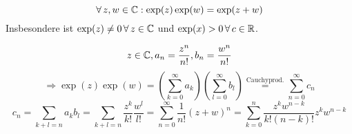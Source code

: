 \documentclass[../ana1.tex]{subfiles}
\begin{document}
\begin{satz}[Additionstherem]
    \[ \forall \, z,w\in\mathbb{C} : \exp(z) \exp(w) = \exp(z+w) \]
    Insbesondere ist \( \exp(z) \neq 0 \,\forall \, z\in\mathbb{C} \) und \( \exp(x)>0 \,\forall \, c\in\mathbb{R} \).
\end{satz}
\begin{bew}
    \[ z\in\mathbb{C}, a_n = \frac{ z^n }{ n! }, b_n = \frac{ w^n }{ n! } \]
    \[ \Rightarrow \exp(z)\exp(w) = \left( \sum_{k=0}^\infty a_k \right) \left( \sum_{l=0}^\infty b_l \right) \overset{\text{Cauchyprod.}}{=} \sum_{n=0}^\infty c_n \]
    \[ c_n = \sum_{k+l=n} a_k b_l = \sum_{k+l=n} \frac{z^k}{k!} \frac{w^l}{l!} = \sum_{n=0}^\infty \frac{1}{n!} {(z+w)}^n = \sum_{k=0}^n \frac{z^k w^{n-k}}{ k! (n-k)! } z^k w^{n-k} \]
\end{bew}
\end{document}
